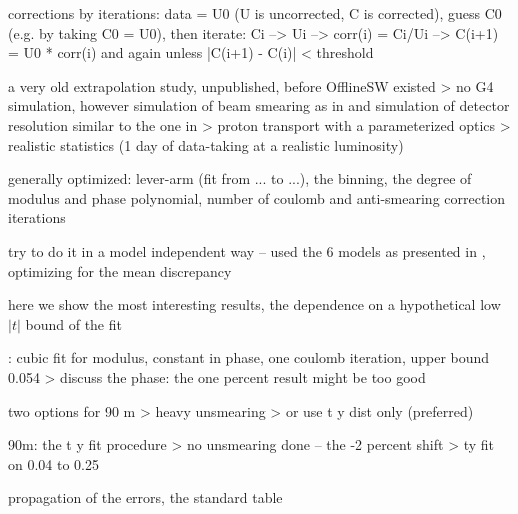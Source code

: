 \bmfig
{}
\emfig

\> corrections by iterations: data = U0 (U is uncorrected, C is corrected), guess C0 (e.g. by taking C0 = U0), then iterate:
Ci --> Ui --> corr(i) = Ci/Ui --> C(i+1) = U0 * corr(i) and again unless |C(i+1) - C(i)| < threshold

\> a very old extrapolation study, unpublished, before OfflineSW existed
\>> no G4 simulation, however simulation of beam smearing as in  and simulation of detector resolution similar to the one in 
\>> proton transport with a parameterized optics 
\>> realistic statistics (1 day of data-taking at a realistic luminosity)

\> generally optimized: lever-arm (fit from ... to ...), the binning, the degree of modulus and phase polynomial, number of coulomb and anti-smearing correction iterations

\> try to do it in a model independent way -- used the 6 models as presented in , optimizing for the mean discrepancy

\> here we show the most interesting results, the dependence on a hypothetical low $|t|$ bound of the fit

: cubic fit for modulus, constant in phase, one coulomb iteration, upper bound 0.054
\>> discuss the phase: the one percent result might be too good


\> two options for 90 m
\>> heavy unsmearing
\>> or use t y dist only (preferred)

\> 90m: the t y fit procedure
\>> no unsmearing done -- the -2 percent shift
\>> ty fit on 0.04 to 0.25

\> propagation of the errors, the standard table


\fi
